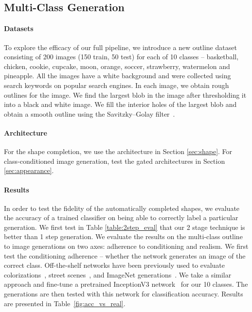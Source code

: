 \subsection{Multi-Class Generation} 
\paragraph{Datasets} To explore the efficacy of our full pipeline, we introduce a new outline dataset consisting of 200 images (150 train, 50 test) for each of 10 classes -- basketball, chicken, cookie, cupcake, moon, orange, soccer, strawberry,  watermelon and pineapple. All the images have a white background and were collected using search keywords on popular search engines.
In each image, we obtain rough outlines for the image. We find the largest blob in the image after thresholding it into a black and white image. We fill the interior holes of the largest blob and obtain a smooth outline using the Savitzky–Golay filter~\cite{savitzky1964smoothing}.

\paragraph{Architecture} For the shape completion, we use the architecture in Section \ref{sec:shape}. For class-conditioned image generation, test the gated architectures in Section \ref{sec:appearance}.
\vspace{-4mm}
\paragraph{Results}
In order to test the fidelity of the automatically completed shapes, we evaluate the accuracy of a trained classifier on being able to correctly label a particular generation.
We first test in Table \ref{table:2step_eval} that our 2 stage technique is better than 1 step generation.
We evaluate the results on the multi-class outline to image generations on two axes: adherence to conditioning and realism. We first test the conditioning adherence -- whether the network generates an image of the correct class.
Off-the-shelf networks have been previously used to evaluate colorizations~\cite{zhang2016colorful}, street scenes~\cite{isola2016image2image, wang2017high}, and ImageNet generations~\cite{salimans2016improved}. 
We take a similar approach and fine-tune a pretrained InceptionV3 network~\cite{szegedy2016rethinking} for our 10 classes. 
The generations are then tested with this network for classification accuracy. Results are presented in Table~\ref{fig:acc_vs_real}.

